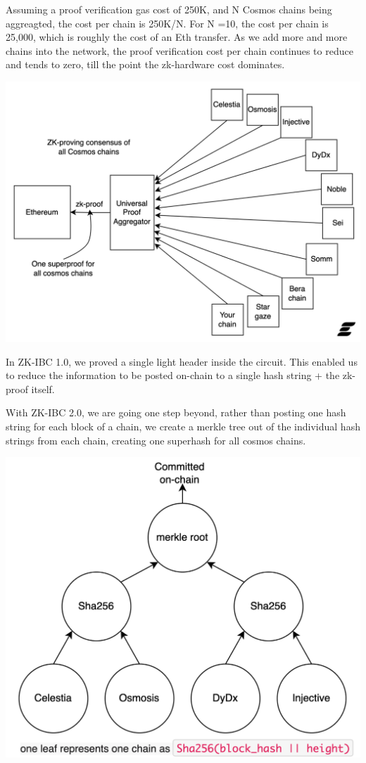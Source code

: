 \documentclass{article}
\begin{document}
Assuming a proof verification gas cost of 250K, and N Cosmos chains being aggreagted, the cost per chain is 250K/N. For N =10, the cost per chain is 25,000, which is roughly the cost of an Eth transfer. As we add more and more chains into the network, the proof verification cost per chain continues to reduce and tends to zero, till the point the zk-hardware cost dominates.

\includegraphics[width=1\linewidth]{ZKIBC2.png}

In ZK-IBC 1.0, we proved a single light header inside the circuit. This enabled us to reduce the information to be posted on-chain to a single hash string + the zk-proof itself.

With ZK-IBC 2.0, we are going one step beyond, rather than posting one hash string for each block of a chain, we create a merkle tree out of the individual hash strings from each chain, creating one superhash for all cosmos chains.

\includegraphics[width=1\linewidth]{ZKIBC_merkle.png}
\end{document}

